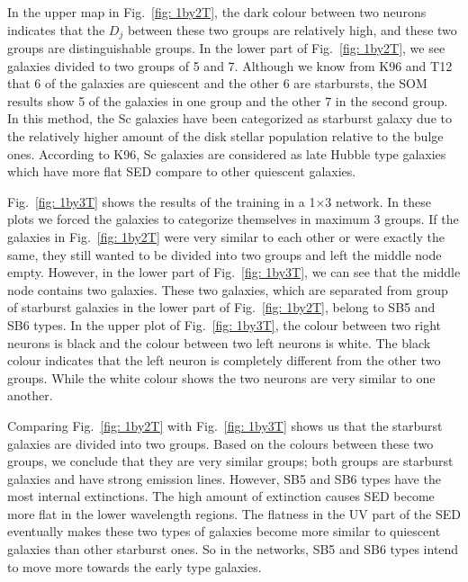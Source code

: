         
        
            In the upper map in Fig.~\ref{fig: 1by2T}, the dark colour between two neurons indicates that the $D_j$ between these two groups are relatively high, and these two groups are distinguishable groups. %
            In the lower part of Fig.~\ref{fig: 1by2T}, we see galaxies divided to two groups of 5 and 7.
            Although we know from K96 and T12 that 6 of the galaxies are quiescent and the other 6 are starbursts, the SOM results show 5 of the galaxies in one group and the other 7 in the second group.
            In this method, the Sc galaxies have been categorized as starburst galaxy due to the relatively higher amount of the disk stellar population relative to the bulge ones. 
            According to K96, Sc galaxies are considered as late Hubble type galaxies which have more flat SED compare to other quiescent galaxies. 
            

            Fig.~\ref{fig: 1by3T} shows the results of the training in a 1$\times$3 network.
            In these plots we forced the galaxies to categorize themselves in maximum 3 groups. 
            If the galaxies in Fig.~\ref{fig: 1by2T} were very similar to each other or were exactly the same, they still wanted to be divided into two groups and left the middle node empty. 
            However, in the lower part of Fig.~\ref{fig: 1by3T}, we can see that the middle node contains two galaxies.
            These two galaxies, which are separated from group of starburst galaxies in the lower part of Fig.~\ref{fig: 1by2T}, belong to SB5 and SB6 types.
            In the upper plot of Fig.~\ref{fig: 1by3T}, the colour between two right neurons is black and the colour between two left neurons is white. 
            The black colour indicates that the left neuron is completely different from the other two groups.
            While the white colour shows the two neurons are very similar to one another. %
            
            Comparing Fig.~\ref{fig: 1by2T} with Fig.~\ref{fig: 1by3T} shows us that the starburst galaxies are divided into two groups. 
            Based on the colours between these two groups, we conclude that they are very similar groups; both groups are starburst galaxies and have strong emission lines.
            However, SB5 and SB6 types have the most internal extinctions.
            The high amount of extinction causes SED become more flat in the lower wavelength regions. %
            The flatness in the UV part of the SED eventually makes these two types of galaxies become more similar to quiescent galaxies than other starburst ones.
            So in the networks, SB5 and SB6 types intend to move more towards the early type galaxies.
                
